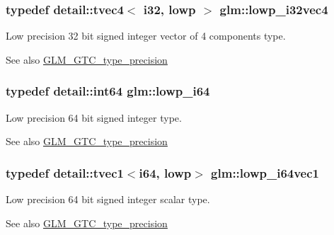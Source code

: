 \subsubsection[{\texorpdfstring{lowp\+\_\+i32vec4}{lowp_i32vec4}}]{\setlength{\rightskip}{0pt plus 5cm}typedef detail\+::tvec4$<$ i32, lowp $>$ {\bf glm\+::lowp\+\_\+i32vec4}}\hypertarget{group__gtc__type__precision_ga99adefeda08a56345b0553d13283d2fa}{}\label{group__gtc__type__precision_ga99adefeda08a56345b0553d13283d2fa}
Low precision 32 bit signed integer vector of 4 components type. \begin{DoxySeeAlso}{See also}
\hyperlink{group__gtc__type__precision}{G\+L\+M\+\_\+\+G\+T\+C\+\_\+type\+\_\+precision} 
\end{DoxySeeAlso}
\subsubsection[{\texorpdfstring{lowp\+\_\+i64}{lowp_i64}}]{\setlength{\rightskip}{0pt plus 5cm}typedef detail\+::int64 {\bf glm\+::lowp\+\_\+i64}}\hypertarget{group__gtc__type__precision_ga1f4ded25f71c0f3b4518936d50b54b6e}{}\label{group__gtc__type__precision_ga1f4ded25f71c0f3b4518936d50b54b6e}
Low precision 64 bit signed integer type. \begin{DoxySeeAlso}{See also}
\hyperlink{group__gtc__type__precision}{G\+L\+M\+\_\+\+G\+T\+C\+\_\+type\+\_\+precision} 
\end{DoxySeeAlso}
\subsubsection[{\texorpdfstring{lowp\+\_\+i64vec1}{lowp_i64vec1}}]{\setlength{\rightskip}{0pt plus 5cm}typedef detail\+::tvec1$<$i64, lowp$>$ {\bf glm\+::lowp\+\_\+i64vec1}}\hypertarget{group__gtc__type__precision_gaf427ced1906a1788fdd9faab2e57c60a}{}\label{group__gtc__type__precision_gaf427ced1906a1788fdd9faab2e57c60a}
Low precision 64 bit signed integer scalar type. \begin{DoxySeeAlso}{See also}
\hyperlink{group__gtc__type__precision}{G\+L\+M\+\_\+\+G\+T\+C\+\_\+type\+\_\+precision} 
\end{DoxySeeAlso}
